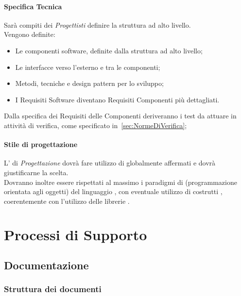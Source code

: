 \documentclass{scalatekids-article}
\begin{document}
\paragraph{Specifica Tecnica}

Sarà compiti dei \textit{Progettisti} definire la struttura ad alto livello.\\
Vengono definite:
\begin{itemize}
    \item Le componenti software, definite dalla struttura ad alto livello;
    \item Le interfacce verso l'esterno e tra le componenti;
    \item Metodi, tecniche e design pattern per lo sviluppo;
    \item I Requisiti Software diventano Requisiti Componenti più
        dettagliati.
\end{itemize}

Dalla specifica dei Requisiti delle Componenti deriveranno i test da attuare in
attività di verifica, come specificato in~\ref{sec:NormeDiVerifica};

\paragraph{Stile di progettazione}

L' di \textit{Progettazione} dovrà fare utilizzo di
 globalmente affermati e dovrà giustificarne la
scelta.\\Dovranno inoltre essere rispettati al massimo i paradigmi di  (programmazione orientata agli oggetti) del linguaggio , con eventuale utilizzo
di costrutti , coerentemente con l'utilizzo delle librerie
\textit{}.
\section{Processi di Supporto}

\subsection{Documentazione}

\subsubsection{Struttura dei documenti}
\end{document}
